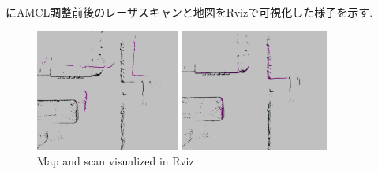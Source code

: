 にAMCL調整前後のレーザスキャンと地図をRvizで可視化した様子を示す.
\begin{figure}[h]
     \centering
     \begin{minipage}[c]{65mm}
         \centering
         \includegraphics[height=40mm]{images/scanmap_before.png}
     \end{minipage}
     \begin{minipage}[c]{65mm}
         \centering
         \includegraphics[height=40mm]{images/scanmap_after.png}
     \end{minipage}
     \caption{Map and scan visualized in Rviz}
     \label{fig:ScanandMap}
\end{figure}
